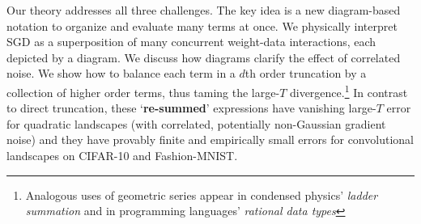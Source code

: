   Our theory addresses all three challenges.  The key idea is
a new diagram-based notation to organize and evaluate many terms at once.  We
physically interpret SGD as a superposition of many concurrent weight-data
interactions, each depicted by a diagram.  We discuss how diagrams clarify
the effect of correlated noise.  We show how to balance each term in
a $d$th order truncation by a collection of higher
order terms, thus taming the large-$T$ divergence.\footnote{%
  Analogous uses of geometric series appear in condensed physics'
  \emph{ladder summation} and in programming languages' \emph{rational data
  types}
}
In contrast to direct truncation, these `\textbf{re-summed}' expressions have
vanishing large-$T$ error for quadratic landscapes (with correlated,
potentially non-Gaussian gradient noise) and they have provably finite and
empirically small errors for convolutional landscapes on CIFAR-10 and
Fashion-MNIST.
 


